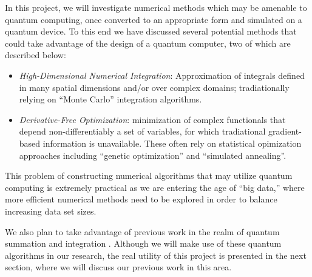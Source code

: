 In this project, we will investigate numerical methods which may be
amenable to quantum computing, once converted to an appropriate form
and simulated on a quantum device.  To this end we have discussed
several potential methods that could take advantage of the design of a
quantum computer, two of which are described below:
\begin{itemize}
\item \emph{High-Dimensional Numerical Integration}: Approximation of
  integrals defined in many spatial dimensions and/or over complex
  domains; tradiationally relying on ``Monte Carlo'' integration
  algorithms.
\item \emph{Derivative-Free Optimization}: minimization of complex
  functionals that depend non-differentiably a set of variables, for
  which tradiational gradient-based information is unavailable.  These
  often rely on statistical opimization approaches including ``genetic
  optimization'' and ``simulated annealing''.
\end{itemize}
This problem of constructing numerical algorithms that may utilize
quantum computing is extremely practical as we are entering the age of
``big data,'' where more efficient numerical methods need to be
explored in order to balance increasing data set sizes.  

We also plan to take advantage of previous work in the realm of
quantum summation and integration \cite{Traub:2002}. Although we will
make use of these quantum algorithms in our research, the real utility
of this project is presented in the next section, where we will
discuss our previous work in this area.


